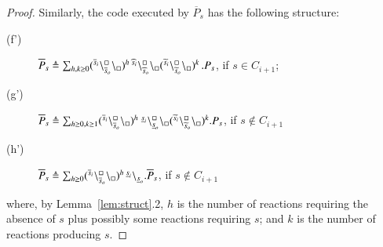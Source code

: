 \begin{proof}
Similarly, the code executed by  $\overline{P}_s$ has the following structure:
\begin{description}
\item[(f')] 
$\overline{P}_s \triangleq  \sum_{h,k\geq 0}({}^{\overline{s}_i}\backslash_{\overline{s}_o}^{\scriptstyle {\square}}\backslash_{\scriptstyle {\square}})^h  \, {}^{\widehat{s}_i}\backslash_{\widehat{s}_o}^{\scriptstyle {\square}}\backslash_{\scriptstyle {\square}}
 ({}^{\widetilde{s}_i}\backslash_{\widetilde{s}_o}^{\scriptstyle {\square}}\backslash_{\scriptstyle {\square}})^k\,.P_s $, if $s \in C_{i+1}$;
\item[(g')] 
$\overline{P}_s \defeq  \sum_{h \geq 0,k\geq 1} (\startchain{\overline{s}_i}\chainedlink{\overline{s}_o}{\noact}\chainend{\noact})^h\ \startchain{\underline{s}_i}\chainedlink{\underline{s}_o}{\noact}\chainend{\noact} (\startchain{\widetilde{s}_i}\chainedlink{\widetilde{s}_o}{\noact}\chainend{\noact})^k.P_s$, if $s \notin C_{i+1}$

\item[(h')] 
$\overline{P}_s \triangleq  \sum_{h \geq 0}({}^{\overline{s}_i}\backslash_{\overline{s}_o}^{\scriptstyle {\square}}\backslash_{\scriptstyle {\square}})^h\,{}^{\underline{s}_i} \backslash_{\underline{s}_o}.\overline{P}_s$, if $s \notin C_{i+1}$
\end{description}
 \noindent
where, by Lemma~\ref{lem:struct}.2, $h$ is the number of reactions requiring the absence of $s$ plus possibly some reactions  requiring $s$; and $k$ is the number of reactions producing $s$.
 

\end{proof}
